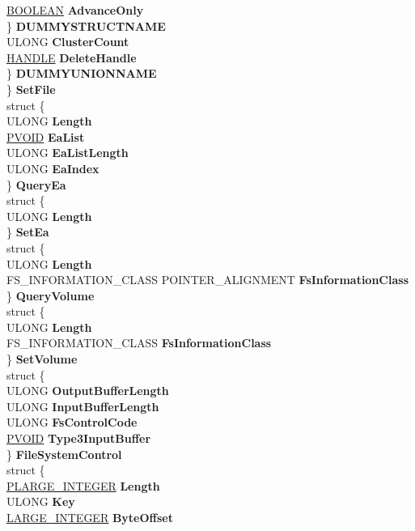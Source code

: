 \begin{DoxyCompactItemize}
\begin{tabbing}
\>\>\>\>\hyperlink{_processor_bind_8h_a112e3146cb38b6ee95e64d85842e380a}{BOOLEAN} {\bfseries AdvanceOnly}\\
\>\>\>\} {\bfseries DUMMYSTRUCTNAME}\\
\>\>\>ULONG {\bfseries ClusterCount}\\
\>\>\>\hyperlink{interfacevoid}{HANDLE} {\bfseries DeleteHandle}\\
\>\>\} {\bfseries DUMMYUNIONNAME}\\
\>\} {\bfseries SetFile}\\
\>struct \{\\
\>\>ULONG {\bfseries Length}\\
\>\>\hyperlink{interfacevoid}{PVOID} {\bfseries EaList}\\
\>\>ULONG {\bfseries EaListLength}\\
\>\>ULONG {\bfseries EaIndex}\\
\>\} {\bfseries QueryEa}\\
\>struct \{\\
\>\>ULONG {\bfseries Length}\\
\>\} {\bfseries SetEa}\\
\>struct \{\\
\>\>ULONG {\bfseries Length}\\
\>\>FS\_INFORMATION\_CLASS POINTER\_ALIGNMENT {\bfseries FsInformationClass}\\
\>\} {\bfseries QueryVolume}\\
\>struct \{\\
\>\>ULONG {\bfseries Length}\\
\>\>FS\_INFORMATION\_CLASS {\bfseries FsInformationClass}\\
\>\} {\bfseries SetVolume}\\
\>struct \{\\
\>\>ULONG {\bfseries OutputBufferLength}\\
\>\>ULONG {\bfseries InputBufferLength}\\
\>\>ULONG {\bfseries FsControlCode}\\
\>\>\hyperlink{interfacevoid}{PVOID} {\bfseries Type3InputBuffer}\\
\>\} {\bfseries FileSystemControl}\\
\>struct \{\\
\>\>\hyperlink{union___l_a_r_g_e___i_n_t_e_g_e_r}{PLARGE\_INTEGER} {\bfseries Length}\\
\>\>ULONG {\bfseries Key}\\
\>\>\hyperlink{union___l_a_r_g_e___i_n_t_e_g_e_r}{LARGE\_INTEGER} {\bfseries ByteOffset}\\

\end{tabbing}
\end{DoxyCompactItemize}
